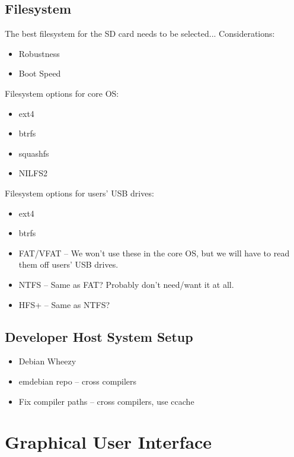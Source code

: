 \subsection{Filesystem}
The best filesystem for the SD card needs to be selected... Considerations:

\begin{itemize}
  \item{Robustness}
  \item{Boot Speed}
\end{itemize}

Filesystem options for core OS:

\begin{itemize}
  \item{ext4}
  \item{btrfs}
  \item{squashfs}
  \item{NILFS2}
\end{itemize}

Filesystem options for users' USB drives:

\begin{itemize}
  \item{ext4}
  \item{btrfs}
  \item{FAT/VFAT} -- We won't use these in the core OS, but we will have to
  read them off users' USB drives.
  \item{NTFS} -- Same as FAT? Probably don't need/want it at all.
  \item{HFS+} -- Same as NTFS?
\end{itemize}


\subsection{Developer Host System Setup}

\begin{itemize}
  \item{Debian Wheezy}
  \item{emdebian repo} -- cross compilers
  \item{Fix compiler paths} -- cross compilers, use ccache

\end{itemize}


\section{Graphical User Interface}

